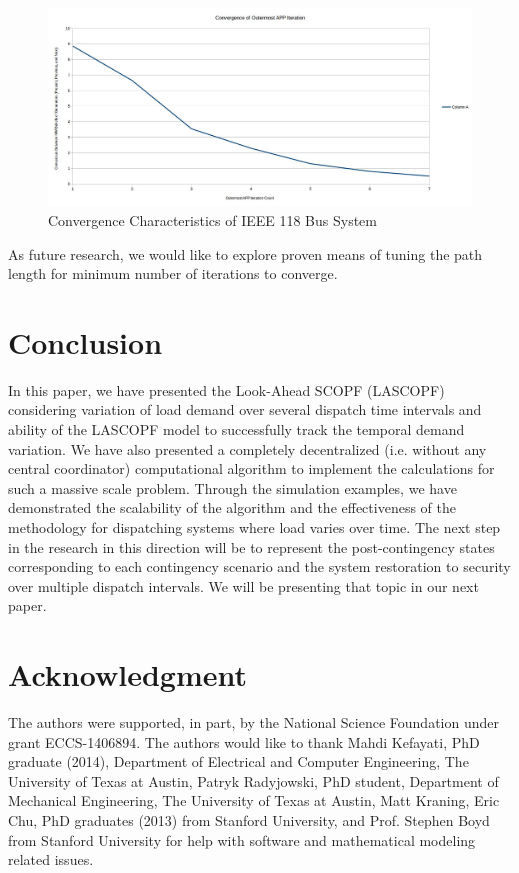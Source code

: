 \documentclass[preprint,12pt,3p]{elsarticle}
\begin{document}
\begin{figure}
\begin{center}
\includegraphics[width=0.92\linewidth,trim=5mm 12mm 5mm 5mm, clip]{N-1_SCOPF_118_Bus.jpg}
\caption{Convergence Characteristics of IEEE 118 Bus System}
\label{118Conv}
\end{center}
\end{figure}
\fi
As future research, we would like to explore proven means of tuning the path length for minimum number of iterations to converge.
\section{Conclusion}
\label{conclusion}
In this paper, we have presented the Look-Ahead SCOPF (LASCOPF) considering variation of load demand over several dispatch time intervals and ability of the LASCOPF model to successfully track the temporal demand variation. We have also presented a completely decentralized (i.e. without any central coordinator) computational algorithm to implement the calculations for such a massive scale problem. Through the simulation examples, we have demonstrated the scalability of the algorithm and the effectiveness of the methodology for dispatching systems where load varies over time. The next step in the research in this direction will be to represent the post-contingency states corresponding to each contingency scenario and the system restoration to security over multiple dispatch intervals. We will be presenting that topic in our next paper.

\appendix

\section{Acknowledgment}

\noindent The authors were supported, in part, by the National Science Foundation
under grant ECCS-1406894. The authors would like to thank Mahdi Kefayati, PhD graduate (2014), Department of Electrical and Computer Engineering, The University of Texas at Austin, Patryk Radyjowski, PhD student, Department of Mechanical Engineering, The University of Texas at Austin, Matt Kraning, Eric Chu, PhD graduates (2013) from Stanford University, and Prof. Stephen Boyd from Stanford University for help with software and mathematical modeling related issues.
\end{document}
